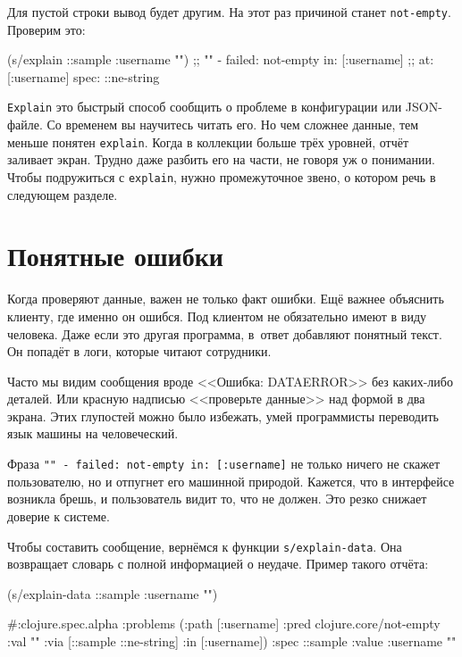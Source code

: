 Для пустой строки вывод будет другим. На этот раз причиной станет
\verb|not-empty|. Проверим это:

\begin{english}
  \begin{clojure}
(s/explain ::sample {:username ""})
;; "" - failed: not-empty in: [:username]
;; at: [:username] spec: ::ne-string
  \end{clojure}
\end{english}

\verb|Explain| это быстрый способ сообщить о проблеме в конфигурации или
JSON-файле. Со временем вы научитесь читать его. Но чем сложнее данные, тем
меньше понятен \verb|explain|. Когда в коллекции больше трёх уровней,
отчёт заливает экран. Трудно даже разбить его на части, не говоря уж о
понимании. Чтобы подружиться с \verb|explain|, нужно промежуточное звено, о
котором речь в следующем разделе.

\section{Понятные ошибки}


\label{spec-messages}

Когда проверяют данные, важен не только факт ошибки. Ещё важнее объяснить
клиенту, где именно он ошибся. Под клиентом не обязательно имеют в виду
человека. Даже если это другая программа, в~ответ добавляют понятный текст. Он
попадёт в логи, которые читают сотрудники.

Часто мы видим сообщения вроде <<Ошибка: DATAERROR>> без каких-либо деталей. Или
красную надписью <<проверьте данные>> над формой в два экрана. Этих глупостей
можно было избежать, умей программисты переводить язык машины на человеческий.


Фраза \verb|"" - failed: not-empty in: [:username]| не только ничего не скажет
пользователю, но и отпугнет его машинной природой. Кажется, что в интерфейсе
возникла брешь, и пользователь видит то, что не должен. Это резко снижает
доверие к системе.

Чтобы составить сообщение, вернёмся к функции \verb|s/explain-data|. Она
возвращает словарь с полной информацией о неудаче. Пример такого отчёта:

\begin{english}
  \begin{clojure}
(s/explain-data ::sample {:username ""})

#:clojure.spec.alpha
{:problems
 ({:path [:username]
   :pred clojure.core/not-empty
   :val ""
   :via [::sample ::ne-string]
   :in [:username]})
 :spec ::sample
 :value {:username ""}}
  \end{clojure}
\end{english}

